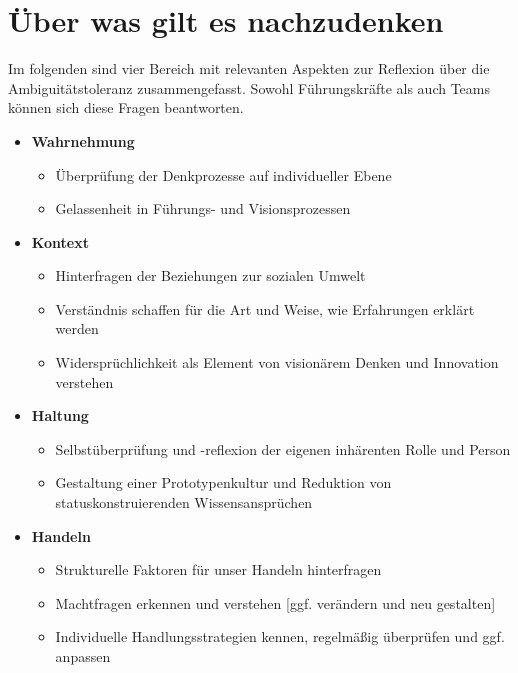 \documentclass[
  ngerman,
  letterpaper,
  DIV=11]{scrartcl}
\providecommand{\tightlist}{%
  \setlength{\itemsep}{0pt}\setlength{\parskip}{0pt}}
\begin{document}
\section{Über was gilt es
nachzudenken}\label{uxfcber-was-gilt-es-nachzudenken}

Im folgenden sind vier Bereich mit relevanten Aspekten zur Reflexion
über die Ambiguitätstoleranz zusammengefasst. Sowohl Führungskräfte als
auch Teams können sich diese Fragen beantworten.

\begin{itemize}
\tightlist
\item
  \textbf{Wahrnehmung}

  \begin{itemize}
  \tightlist
  \item
    Überprüfung der Denkprozesse auf individueller Ebene
  \item
    Gelassenheit in Führungs- und Visionsprozessen
  \end{itemize}
\item
  \textbf{Kontext}

  \begin{itemize}
  \tightlist
  \item
    Hinterfragen der Beziehungen zur sozialen Umwelt
  \item
    Verständnis schaffen für die Art und Weise, wie Erfahrungen erklärt
    werden
  \item
    Widersprüchlichkeit als Element von visionärem Denken und Innovation
    verstehen
  \end{itemize}
\item
  \textbf{Haltung}

  \begin{itemize}
  \tightlist
  \item
    Selbstüberprüfung und -reflexion der eigenen inhärenten Rolle und
    Person
  \item
    Gestaltung einer Prototypenkultur und Reduktion von
    statuskonstruierenden Wissensansprüchen
  \end{itemize}
\item
  \textbf{Handeln}

  \begin{itemize}
  \tightlist
  \item
    Strukturelle Faktoren für unser Handeln hinterfragen
  \item
    Machtfragen erkennen und verstehen {[}ggf. verändern und neu
    gestalten{]}
  \item
    Individuelle Handlungsstrategien kennen, regelmäßig überprüfen und
    ggf. anpassen
  \end{itemize}
\end{itemize}
\end{document}
